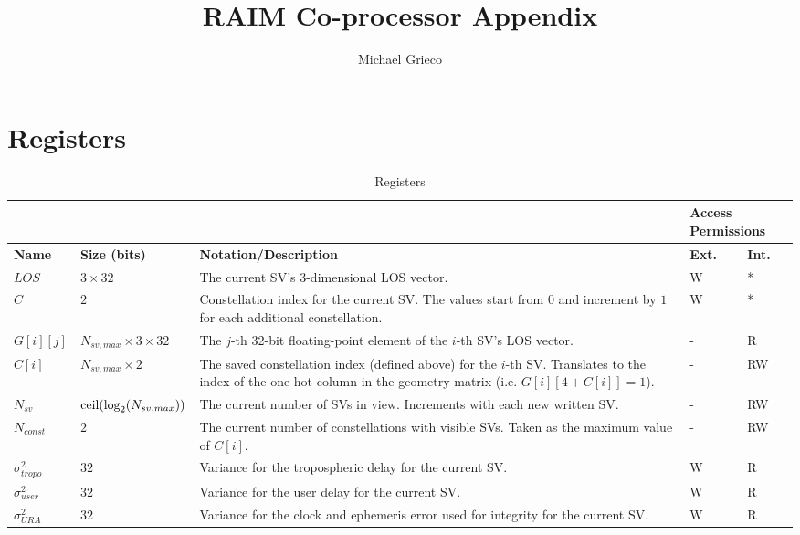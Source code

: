 \documentclass[11pt]{article}
\title{RAIM Co-processor Appendix}
\author{Michael Grieco}
\date{}
\begin{document}
\section{Registers}

\begin{table}[htbp] \begin{center}
  \caption{Registers}\label{tab:reg}
  \begin{tabular}{|m{1.5cm}|m{1.5cm}|m{6cm}|m{1cm}|m{1cm}|}
    \cline{4-5}
    \multicolumn{3}{m{9cm}|}{} & \multicolumn{2}{m{2cm}|}{Access Permissions}\\ \hline
    \textbf{Name} & \textbf{Size (bits)} & \textbf{Notation/Description} & \textbf{Ext.} & \textbf{Int.}\\ \hline

    $LOS$ & $3 \times 32$ & The current SV's 3-dimensional LOS vector. & W & *\\ \hline

    $C$ & $2$ & Constellation index for the current SV. The values start from $0$ and increment by $1$ for each additional constellation. & W & *\\ \hline

    $G[i][j]$ & $N_{sv,max} \times 3 \times 32$ & The $j$-th 32-bit floating-point element of the $i$-th SV's LOS vector. & - & R\\ \hline

    $C[i]$ & $N_{sv,max} \times 2$ & The saved constellation index (defined above) for the $i$-th SV. Translates to the index of the one hot column in the geometry matrix (i.e. $G[i][4+C[i]]=1$). & - & RW\\ \hline

    $N_{sv}$ & $\text{ceil} ( \text{log}_2 ( \newline N_{sv,max} ) )$ & The current number of SVs in view. Increments with each new written SV. & - & RW\\ \hline

    $N_{const}$ & $2$ & The current number of constellations with visible SVs. Taken as the maximum value of $C[i]$. & - & RW\\ \hline

    $\sigma_{tropo}^2$ & $32$ & Variance for the tropospheric delay for the current SV. & W & R\\ \hline

    $\sigma_{user}^2$ & $32$ & Variance for the user delay for the current SV. & W & R\\ \hline

    $\sigma_{URA}^2$ & $32$ & Variance for the clock and ephemeris error used for integrity for the current SV. & W & R\\ \hline


\end{tabular}
\end{center}
\end{table}
\end{document}
